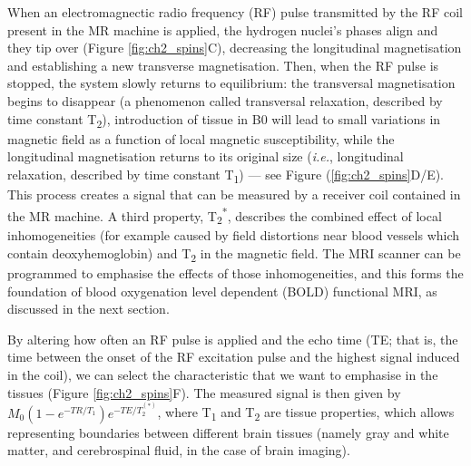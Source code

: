 When an electromagnectic radio frequency (RF) pulse transmitted by the RF coil present in the MR machine is applied, the hydrogen nuclei's phases align and they tip over (Figure \ref{fig:ch2_spins}C), decreasing the longitudinal magnetisation and establishing a new transverse magnetisation. 
Then, when the RF pulse is stopped, the system slowly returns to equilibrium: the transversal magnetisation begins to disappear (a phenomenon called transversal relaxation, described by time constant T\textsubscript{2}), introduction of tissue in B0 will lead to small variations in magnetic field as a function of local magnetic susceptibility, while the longitudinal magnetisation returns to its original size (\textit{i.e.}, longitudinal relaxation, described by time constant T\textsubscript{1}) --- see Figure (\ref{fig:ch2_spins}D/E). 
This process creates a signal that can be measured by a receiver coil contained in the MR machine. 
A third property,  T\textsubscript{2}\textsuperscript{*}, describes the combined effect of local inhomogeneities (for example caused by field distortions near blood vessels which contain deoxyhemoglobin) and T\textsubscript{2} in the magnetic field. 
The MRI scanner can be programmed to emphasise the effects of those inhomogeneities, and this forms the foundation of blood oxygenation level dependent (BOLD) functional MRI, as discussed in the next section.

By altering how often an RF pulse is applied and the echo time (TE;  that is, the time between the onset of the RF excitation pulse and the highest signal induced in the coil), we can select the characteristic that we want to emphasise in the tissues (Figure \ref{fig:ch2_spins}F). 
The measured signal is then given by $M_0 (1-e ^{-TR/T_1} )e^{-TE/T_2^{(*)}}$,
where T\textsubscript{1} and T\textsubscript{2} are tissue properties, which allows representing boundaries between different brain tissues (namely gray and white matter, and cerebrospinal fluid, in the case of brain imaging).

